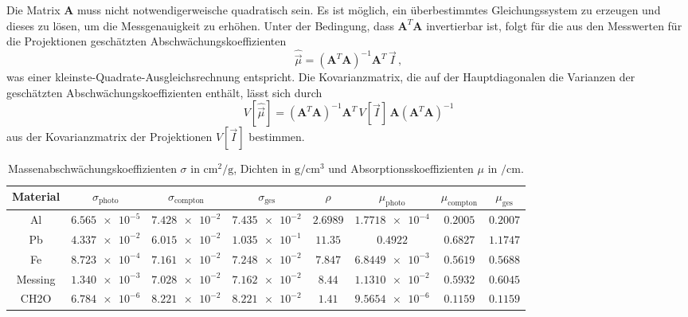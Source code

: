 Die Matrix $\symbf{A}$ muss nicht notwendigerweische quadratisch sein. Es ist möglich, ein überbestimmtes Gleichungssystem zu erzeugen und dieses zu lösen, um die Messgenauigkeit zu erhöhen. Unter der Bedingung, dass $\symbf{A}^T \symbf{A}$ invertierbar ist, folgt für die aus den Messwerten für die Projektionen geschätzten Abschwächungskoeffizienten
\begin{equation}
	\hat{\vec{\mu}} = (\symbf{A}^T \symbf{A})^{-1} \symbf{A}^T \, \vec{I}\,,
\end{equation}
was einer kleinste-Quadrate-Ausgleichsrechnung entspricht.
Die Kovarianzmatrix, die auf der Hauptdiagonalen die Varianzen der geschätzten Abschwächungskoeffizienten enthält, lässt sich durch
\begin{equation}
	V[\hat{\vec{\mu}}] = (\symbf{A}^T \symbf{A})^{-1} \symbf{A}^T \, V[\vec{I}] \, \symbf{A} (\symbf{A}^T \symbf{A})^{-1}
\end{equation}
aus der Kovarianzmatrix der Projektionen $V[\vec{I}]$ bestimmen.



\begin{table}[htp]
	\begin{center}
    \caption{Massenabschwächungskoeffizienten $\sigma$ in $\si{\centi\meter\squared\per\gram}$, Dichten in $\si{\gram\per\centi\meter\cubed}$ und Absorptionsskoeffizienten $\mu$ in $\si{\per\centi\meter}$.}
    \label{tab:dicke}
		\begin{tabular}{cccccccc}
		\toprule
			Material & $\sigma_{\text{photo}}$ & $\sigma_{\text{compton}}$ & $\sigma_{\text{ges}}$ & $\rho$ & $\mu_{\text{photo}}$ & $\mu_{\text{compton}}$ & $\mu_{\text{ges}}$\\
			\midrule
			Al & $\num{6.565e-5}$ & $\num{7.428e-2}$ & $\num{7.435e-2}$ & $\num{2.6989}$ & $\num{1.7718e-4}$ & $\num{0.2005}$ & $\num{0.2007}$\\
      Pb & $\num{4.337e-2}$ & $\num{6.015e-2}$ & $\num{1.035e-1}$ & $\num{11.35}$ & $\num{0.4922}$ & $\num{0.6827}$ & $\num{1.1747}$\\
      Fe & $\num{8.723e-4}$ & $\num{7.161e-2}$ & $\num{7.248e-2}$ & $\num{7.847}$ & $\num{6.8449e-3}$ & $\num{0.5619}$ & $\num{0.5688}$\\
      Messing & $\num{1.340e-3}$ & $\num{7.028e-2}$ & $\num{7.162e-2}$ & $\num{8.44}$ & $\num{1.1310e-2}$ & $\num{0.5932}$ & $\num{0.6045}$\\
      CH2O & $\num{6.784e-6}$ & $\num{8.221e-2}$ & $\num{8.221e-2}$ & $\num{1.41}$ & $\num{9.5654e-6}$ & $\num{0.1159}$ & $\num{0.1159}$\\
		\bottomrule
		\end{tabular}
	\end{center}
\end{table}
